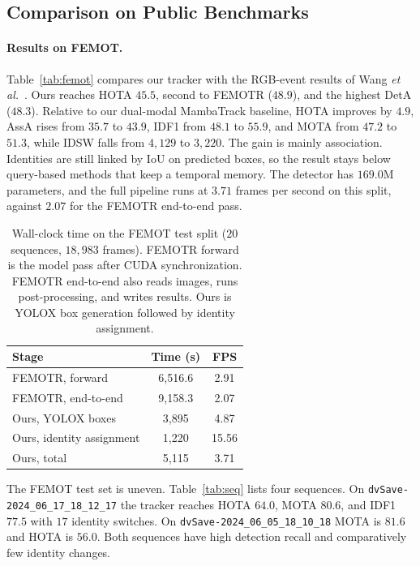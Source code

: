 \documentclass[10pt,twocolumn,letterpaper]{article}
\begin{document}
\subsection{Comparison on Public Benchmarks}

\paragraph{Results on FEMOT.}
Table~\ref{tab:femot} compares our tracker with the RGB-event results of Wang \emph{et al.}~\cite{wang2026femot}. Ours reaches HOTA $45.5$, second to FEMOTR ($48.9$), and the highest DetA ($48.3$). Relative to our dual-modal MambaTrack baseline, HOTA improves by $4.9$, AssA rises from $35.7$ to $43.9$, IDF1 from $48.1$ to $55.9$, and MOTA from $47.2$ to $51.3$, while IDSW falls from $4{,}129$ to $3{,}220$. The gain is mainly association. Identities are still linked by IoU on predicted boxes, so the result stays below query-based methods that keep a temporal memory. The detector has $169.0$M parameters, and the full pipeline runs at $3.71$ frames per second on this split, against $2.07$ for the FEMOTR end-to-end pass.

\begin{table}
  \centering
  \small
  \setlength{\tabcolsep}{6pt}
  \caption{Wall-clock time on the FEMOT test split ($20$ sequences, $18{,}983$ frames). FEMOTR forward is the model pass after CUDA synchronization. FEMOTR end-to-end also reads images, runs post-processing, and writes results. Ours is YOLOX box generation followed by identity assignment.}
  \label{tab:runtime}
  \begin{tabular}{lcc}
    \toprule
    Stage & Time (s) & FPS \\
    \midrule
    FEMOTR, forward & 6,516.6 & 2.91 \\
    FEMOTR, end-to-end & 9,158.3 & 2.07 \\
    Ours, YOLOX boxes & 3,895 & 4.87 \\
    Ours, identity assignment & 1,220 & 15.56 \\
    Ours, total & 5,115 & 3.71 \\
    \bottomrule
  \end{tabular}
\end{table}

The FEMOT test set is uneven. Table~\ref{tab:seq} lists four sequences. On \texttt{dvSave-2024\_06\_17\_18\_12\_17} the tracker reaches HOTA $64.0$, MOTA $80.6$, and IDF1 $77.5$ with $17$ identity switches. On \texttt{dvSave-2024\_06\_05\_18\_10\_18} MOTA is $81.6$ and HOTA is $56.0$. Both sequences have high detection recall and comparatively few identity changes.
\end{document}
